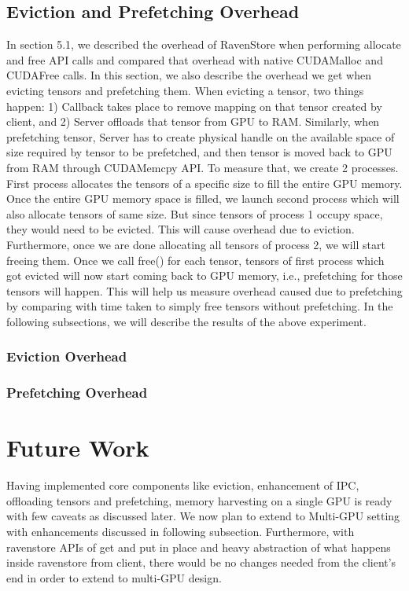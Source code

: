 \documentclass{article}
\begin{document}
\subsection{Eviction and Prefetching Overhead}
In section 5.1, we described the overhead of RavenStore when performing allocate and free API calls and compared that overhead with 
native CUDAMalloc and CUDAFree calls. In this section, we also describe the overhead we get when evicting tensors and prefetching them.
When evicting a tensor, two things happen: 1) Callback takes place to remove mapping on that tensor created by client, and 2) Server
offloads that tensor from GPU to RAM. Similarly, when prefetching tensor, Server has to create physical handle on the available space of
size required by tensor to be prefetched, and then tensor is moved back to GPU from RAM through CUDAMemcpy API.
To measure that, we create 2 processes. First process allocates the tensors of a specific size to fill the entire GPU memory. Once the entire GPU
memory space is filled, we launch second process which will also allocate tensors of same size. But since tensors of process 1 occupy space, they would
need to be evicted. This will cause overhead due to eviction. Furthermore, once we are done allocating all tensors of process 2, we will start freeing them.
Once we call free() for each tensor, tensors of first process which got evicted will now start coming back to GPU memory, i.e., prefetching for those
tensors will happen. This will help us measure overhead caused due to prefetching by comparing with time taken to simply free tensors without prefetching.
In the following subsections, we will describe the results of the above experiment.

\subsubsection{Eviction Overhead}
\subsubsection{Prefetching Overhead}

\section{Future Work}
Having implemented core components like eviction, enhancement of IPC, offloading tensors and prefetching, memory harvesting
on a single GPU is ready with few caveats as discussed later. We now plan
to extend to Multi-GPU setting with enhancements discussed in following subsection. 
Furthermore, with ravenstore APIs of get and put in place and heavy abstraction of what
happens inside ravenstore from client, there would be no changes needed from the client's end
in order to extend to multi-GPU design.
\end{document}
